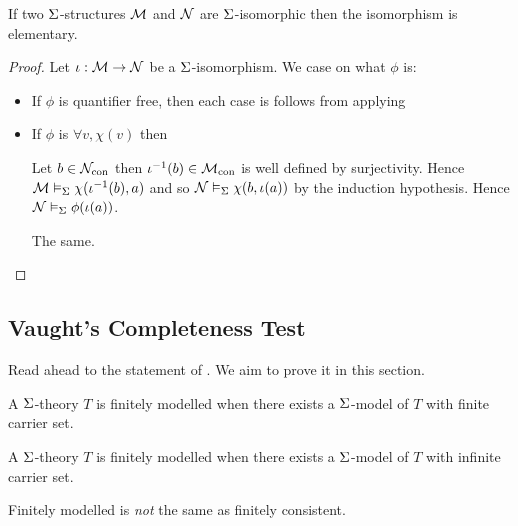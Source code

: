 \begin{prop}
    If two $\Sigma$-structures $\mathcal{M}$ and $\mathcal{N}$ 
    are $\Sigma$-isomorphic then the isomorphism is elementary.
\end{prop}
\begin{proof}
    Let $\iota : \mathcal{M} \to \mathcal{N}$ be a $\Sigma$-isomorphism.
    We case on what $\phi$ is:
    \begin{itemize}
        \item If $\phi$ is quantifier free, 
            then each case is follows from applying
        \item If $\phi$ is $\forall v, \chi(v)$ then
            \begin{forward}
                Let $b \in {\mathcal{N}}_\mathrm{con}$ then
                $\iota^{-1}(b) \in {\mathcal{M}}_\mathrm{con}$ is well defined by surjectivity.
                Hence $\mathcal{M} \vDash_{\Sigma} \chi(\iota^{-1}(b),a)$ and so
                $\mathcal{N} \vDash_{\Sigma} \chi(b,\iota(a))$ by the induction hypothesis.
                Hence $\mathcal{N} \vDash_{\Sigma} \phi(\iota(a))$.
            \end{forward}
            \begin{backward}
                The same.
            \end{backward}
    \end{itemize}
\end{proof}

\subsection{Vaught's Completeness Test}
Read ahead to the statement of .
We aim to prove it in this section.

\begin{dfn}
    A $\Sigma$-theory $T$ 
    is finitely modelled when
    there exists a $\Sigma$-model of $T$ 
    with finite carrier set.

    A $\Sigma$-theory $T$ 
    is finitely modelled when
    there exists a $\Sigma$-model of $T$ 
    with infinite carrier set.
\end{dfn}
Finitely modelled is \emph{not} the same as finitely consistent.

